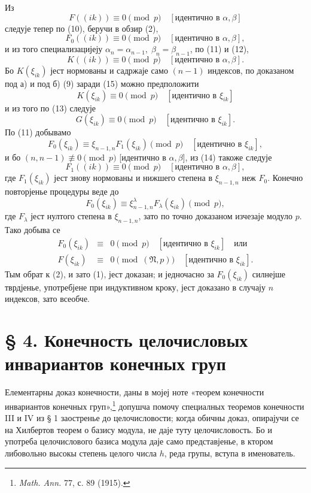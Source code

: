﻿\documentclass[11pt]{article}
\providecommand{\frN}{\mathfrak N}
\begin{document}
Из
\[
        F((ik))\equiv0\pmod p\quad [\text{идентично в \(\alpha,\beta\)}]
\]
следује тепер по (10), беручи в обзир (2),
\begin{equation}
        F_0((ik))\equiv0\pmod p\quad [\text{идентично в \(\alpha,\beta\)}],
\end{equation}
и из того специализацијеју \(\alpha_n=\alpha_{n-1},\;\beta_n=\beta_{n-1}\), по (11) и (12),
\begin{equation}
        K((ik))\equiv0\pmod p\quad [\text{идентично в \(\alpha,\beta\)}].
\end{equation}
Бо \(K(\xi_{ik})\) јест нормованы и садржаје само \((n-1)\) индексов, по доказаном под а) и под б) (9) заради (15) можно предположити
\[
        K(\xi_{ik})\equiv0\pmod p\quad [\text{идентично в \(\xi_{ik}\)}]
\]
и из того по (13) следује
\[
        G(\xi_{ik})\equiv0\pmod p\quad [\text{идентично в \(\xi_{ik}\)}].
\]
По (11) добывамо
\[
        F_0(\xi_{ik})\equiv\xi_{n-1,n}F_1(\xi_{ik})\pmod p\quad [\text{идентично в \(\xi_{ik}\)}],
\]
и бо \((n,n-1)\not\equiv0\pmod p\) [идентично в \(\alpha,\beta\)], из (14) такоже следује
\[
        F_1((ik))\equiv0\pmod p\quad [\text{идентично в \(\alpha,\beta\)}],
\]
где \(F_1(\xi_{ik})\) јест знову нормованы и нижшего степена в \(\xi_{n-1,n}\) неж \(F_0\). Конечно повторјенье процедуры веде до
\[
        F_0(\xi_{ik})\equiv\xi_{n-1,n}^{\lambda}F_\lambda(\xi_{ik})\pmod p,
\]
где \(F_\lambda\) јест нултого степена в \(\xi_{n-1,n}\), зато по точно доказаном изчезаје модуло \(p\). Тако добыва се
\begin{equation}
\begin{array}{rcl}
        F_0(\xi_{ik})&\equiv&0\pmod p\quad [\text{идентично в \(\xi_{ik}\)}]\quad \text{или}\\
        F(\xi_{ik})&\equiv&0\pmod{(\frN,p)}\quad [\text{идентично в \(\xi_{ik}\)}].
\end{array}
\end{equation}
Тым обрат к (2), и зато (1), јест доказан; и једночасно за \(F_0(\xi_{ik})\) силнејше тврдјенье, употребјене при индуктивном кроку, јест доказано в случају \(n\) индексов, зато всеобче.

\setcounter{equation}{0}
\section*{§ 4. Конечность целочисловых инвариантов конечных груп}

Елементарны доказ конечности, даны в мојеј ноте «теорем конечности инвариантов конечных груп»,\footnote{\emph{Math. Ann.} 77, с. 89 (1915).} допушча помочу специалных теоремов конечности III и IV из § 1 заостренье до целочисловости; когда обичны доказ, опирајучи се на Хилбертов теорем о базису модула, не даје туту целочисловость. Бо и употреба целочислового базиса модула даје само представјенье, в ктором либовольно высокы степень целого числа \(h\), реда групы, вступа в именователь.
\end{document}
